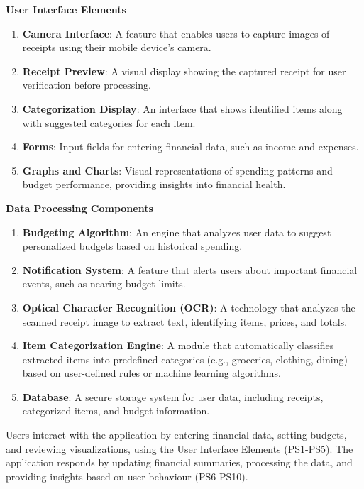 \documentclass[12pt]{article}
\begin{document}
\noindent
\textbf{User Interface Elements}
\begin{enumerate}[label=PS\arabic*]
  \item \textbf{Camera Interface}: A feature that enables users to capture
  images of receipts using their mobile device’s camera.
  \item \textbf{Receipt Preview}: A visual display showing the captured
  receipt for user verification before processing.
  \item \textbf{Categorization Display}: An interface that shows identified
  items along with suggested categories for each item.
  \item \textbf{Forms}: Input fields for entering financial data, such as
  income and expenses.
  \item \textbf{Graphs and Charts}: Visual representations of spending
  patterns and budget performance, providing insights into financial health.
\end{enumerate}

\noindent
\textbf{Data Processing Components}
\begin{enumerate}[label=PS\arabic*, start=6]
  \item \textbf{Budgeting Algorithm}: An engine that analyzes user data to
  suggest personalized budgets based on historical spending.
  \item \textbf{Notification System}: A feature that alerts users about
  important financial events, such as nearing budget limits.
  \item \textbf{Optical Character Recognition (OCR)}: A technology that
  analyzes the scanned receipt image to extract text, identifying items, prices,
  and totals.
  \item \textbf{Item Categorization Engine}: A module that automatically
  classifies extracted items into predefined categories (e.g., groceries,
  clothing, dining) based on user-defined rules or machine learning algorithms.
  \item \textbf{Database}: A secure storage system for user data, including
  receipts, categorized items, and budget information.
\end{enumerate}

Users interact with the application by entering financial data, setting budgets,
  and reviewing visualizations, using the User Interface Elements (PS1-PS5).
  The application responds by updating financial summaries, processing the
  data, and providing insights based on user behaviour (PS6-PS10).
\end{document}
